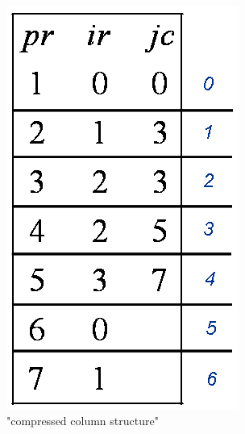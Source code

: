 \begin{figure}[htbp]
\begin{center}
\begin{minipage}[t]{0.4\linewidth}
			\includegraphics[width=\linewidth]{.//pic//numerische_sparse2}
			\caption{"compressed column structure"}
			\label{numerische_sparse2}
		\end{minipage}
	\end{center}
\end{figure}
